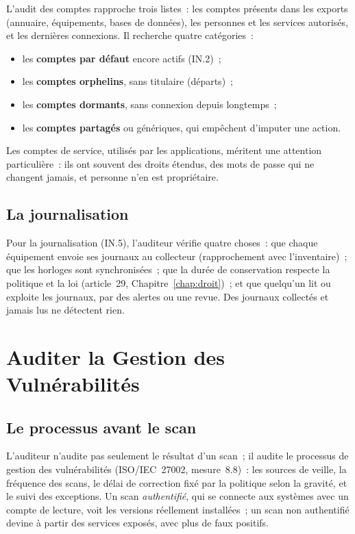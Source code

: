 L'audit des comptes rapproche trois listes~: les comptes présents dans les
exports (annuaire, équipements, bases de données), les personnes et les
services autorisés, et les dernières connexions. Il recherche quatre
catégories~:
\begin{itemize}
    \item les \textbf{comptes par défaut} encore actifs (IN.2)~;
    \item les \textbf{comptes orphelins}, sans titulaire (départs)~;
    \item les \textbf{comptes dormants}, sans connexion depuis longtemps~;
    \item les \textbf{comptes partagés} ou génériques, qui empêchent
          d'imputer une action.
\end{itemize}
Les comptes de service, utilisés par les applications, méritent une
attention particulière~: ils ont souvent des droits étendus, des mots de
passe qui ne changent jamais, et personne n'en est propriétaire.

\subsection{La journalisation}

Pour la journalisation (IN.5), l'auditeur vérifie quatre choses~: que
chaque équipement envoie ses journaux au collecteur (rapprochement avec
l'inventaire)~; que les horloges sont synchronisées~; que la durée de
conservation respecte la politique et la loi (article~29,
Chapitre~\ref{chap:droit})~; et que quelqu'un lit ou exploite les journaux,
par des alertes ou une revue. Des journaux collectés et jamais lus ne
détectent rien.

\section{Auditer la Gestion des Vulnérabilités}
\label{sec:c12-vulnerabilites}

\subsection{Le processus avant le scan}

L'auditeur n'audite pas seulement le résultat d'un scan~; il audite le
processus de gestion des vulnérabilités (ISO/IEC~27002, mesure~8.8)~: les
sources de veille, la fréquence des scans, le délai de correction fixé par
la politique selon la gravité, et le suivi des exceptions. Un scan
\emph{authentifié}, qui se connecte aux systèmes avec un compte de lecture,
voit les versions réellement installées~; un scan non authentifié devine à
partir des services exposés, avec plus de faux positifs.

